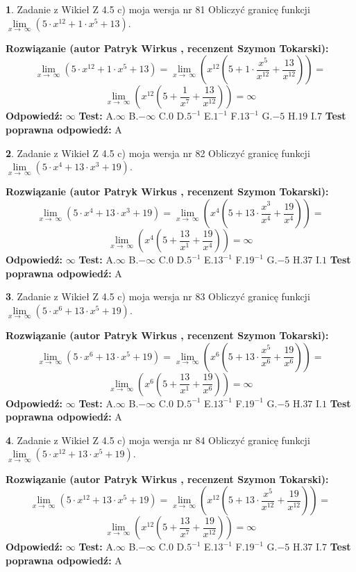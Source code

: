 \documentclass[12pt, a4paper]{article}
\theoremstyle{definition} %
\newtheorem{zad}{}
\newcommand{\zadStart}[1]{\begin{zad}#1\newline}
\newcommand{\zadStop}{\end{zad}}
\newcommand{\rozwStart}[2]{\noindent \textbf{Rozwiązanie (autor #1 , recenzent #2): }\newline}
\newcommand{\rozwStop}{\newline}
\newcommand{\odpStart}{\noindent \textbf{Odpowiedź:}\newline}
\newcommand{\odpStop}{\newline}
\newcommand{\testStart}{\noindent \textbf{Test:}\newline}
\newcommand{\testStop}{\newline}
\newcommand{\kluczStart}{\noindent \textbf{Test poprawna odpowiedź:}\newline}
\newcommand{\kluczStop}{\newline}
\begin{document}
\zadStart{Zadanie z Wikieł Z 4.5 c) moja wersja nr 81}
Obliczyć granicę funkcji  $\lim\limits_{x\to\ \infty}(5 \cdot x^{12}+1 \cdot x^{5}+13)$.
\zadStop
\rozwStart{Patryk Wirkus}{Szymon Tokarski}
$$\lim\limits_{x\to\ \infty}(5 \cdot x^{12}+1 \cdot x^{5}+13) = \lim\limits_{x\to\ \infty}(x^{12}(5 +1 \cdot \frac{x^{5}}{x^{12}}+\frac{13}{x^{12}})) =$$ $$\lim\limits_{x\to\ \infty}(x^{12}(5 +\frac{1}{x^{7}}+\frac{13}{x^{12}})) =\infty$$
\rozwStop
\odpStart
$\infty$
\odpStop
\testStart
A.$\infty$ B.$-\infty$ C.$0$ D.$5^{-1}$ E.$1^{-1}$
F.$13^{-1}$ G.$-5$
H.$19$
I.$7$
\testStop
\kluczStart
A
\kluczStop



\zadStart{Zadanie z Wikieł Z 4.5 c) moja wersja nr 82}
Obliczyć granicę funkcji  $\lim\limits_{x\to\ \infty}(5 \cdot x^{4}+13 \cdot x^{3}+19)$.
\zadStop
\rozwStart{Patryk Wirkus}{Szymon Tokarski}
$$\lim\limits_{x\to\ \infty}(5 \cdot x^{4}+13 \cdot x^{3}+19) = \lim\limits_{x\to\ \infty}(x^{4}(5 +13 \cdot \frac{x^{3}}{x^{4}}+\frac{19}{x^{4}})) =$$ $$\lim\limits_{x\to\ \infty}(x^{4}(5 +\frac{13}{x^{1}}+\frac{19}{x^{4}})) =\infty$$
\rozwStop
\odpStart
$\infty$
\odpStop
\testStart
A.$\infty$ B.$-\infty$ C.$0$ D.$5^{-1}$ E.$13^{-1}$
F.$19^{-1}$ G.$-5$
H.$37$
I.$1$
\testStop
\kluczStart
A
\kluczStop



\zadStart{Zadanie z Wikieł Z 4.5 c) moja wersja nr 83}
Obliczyć granicę funkcji  $\lim\limits_{x\to\ \infty}(5 \cdot x^{6}+13 \cdot x^{5}+19)$.
\zadStop
\rozwStart{Patryk Wirkus}{Szymon Tokarski}
$$\lim\limits_{x\to\ \infty}(5 \cdot x^{6}+13 \cdot x^{5}+19) = \lim\limits_{x\to\ \infty}(x^{6}(5 +13 \cdot \frac{x^{5}}{x^{6}}+\frac{19}{x^{6}})) =$$ $$\lim\limits_{x\to\ \infty}(x^{6}(5 +\frac{13}{x^{1}}+\frac{19}{x^{6}})) =\infty$$
\rozwStop
\odpStart
$\infty$
\odpStop
\testStart
A.$\infty$ B.$-\infty$ C.$0$ D.$5^{-1}$ E.$13^{-1}$
F.$19^{-1}$ G.$-5$
H.$37$
I.$1$
\testStop
\kluczStart
A
\kluczStop



\zadStart{Zadanie z Wikieł Z 4.5 c) moja wersja nr 84}
Obliczyć granicę funkcji  $\lim\limits_{x\to\ \infty}(5 \cdot x^{12}+13 \cdot x^{5}+19)$.
\zadStop
\rozwStart{Patryk Wirkus}{Szymon Tokarski}
$$\lim\limits_{x\to\ \infty}(5 \cdot x^{12}+13 \cdot x^{5}+19) = \lim\limits_{x\to\ \infty}(x^{12}(5 +13 \cdot \frac{x^{5}}{x^{12}}+\frac{19}{x^{12}})) =$$ $$\lim\limits_{x\to\ \infty}(x^{12}(5 +\frac{13}{x^{7}}+\frac{19}{x^{12}})) =\infty$$
\rozwStop
\odpStart
$\infty$
\odpStop
\testStart
A.$\infty$ B.$-\infty$ C.$0$ D.$5^{-1}$ E.$13^{-1}$
F.$19^{-1}$ G.$-5$
H.$37$
I.$7$
\testStop
\kluczStart
A
\kluczStop
\end{document}
